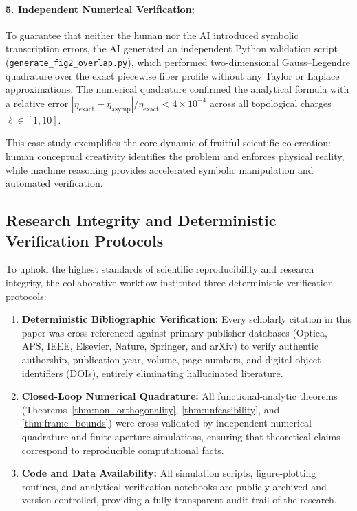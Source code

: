 \documentclass[11pt,a4paper]{article}
\begin{document}
\paragraph{5. Independent Numerical Verification:}
To guarantee that neither the human nor the AI introduced symbolic transcription errors, the AI generated an independent Python validation script (\texttt{generate\_fig2\_overlap.py}), which performed two-dimensional Gauss--Legendre quadrature over the exact piecewise fiber profile without any Taylor or Laplace approximations. The numerical quadrature confirmed the analytical formula with a relative error $|\eta_{\text{exact}} - \eta_{\text{asymp}}| / \eta_{\text{exact}} < 4 \times 10^{-4}$ across all topological charges $\ell \in [1, 10]$.

This case study exemplifies the core dynamic of fruitful scientific co-creation: human conceptual creativity identifies the problem and enforces physical reality, while machine reasoning provides accelerated symbolic manipulation and automated verification.

\subsection{Research Integrity and Deterministic Verification Protocols}
\label{subsec:research_integrity}

To uphold the highest standards of scientific reproducibility and research integrity, the collaborative workflow instituted three deterministic verification protocols:
\begin{enumerate}
    \item \textbf{Deterministic Bibliographic Verification:} Every scholarly citation in this paper was cross-referenced against primary publisher databases (Optica, APS, IEEE, Elsevier, Nature, Springer, and arXiv) to verify authentic authorship, publication year, volume, page numbers, and digital object identifiers (DOIs), entirely eliminating hallucinated literature.
    \item \textbf{Closed-Loop Numerical Quadrature:} All functional-analytic theorems (Theorems~\ref{thm:non_orthogonality}, \ref{thm:unfeasibility}, and \ref{thm:frame_bounds}) were cross-validated by independent numerical quadrature and finite-aperture simulations, ensuring that theoretical claims correspond to reproducible computational facts.
    \item \textbf{Code and Data Availability:} All simulation scripts, figure-plotting routines, and analytical verification notebooks are publicly archived and version-controlled, providing a fully transparent audit trail of the research.
\end{enumerate}
\end{document}
